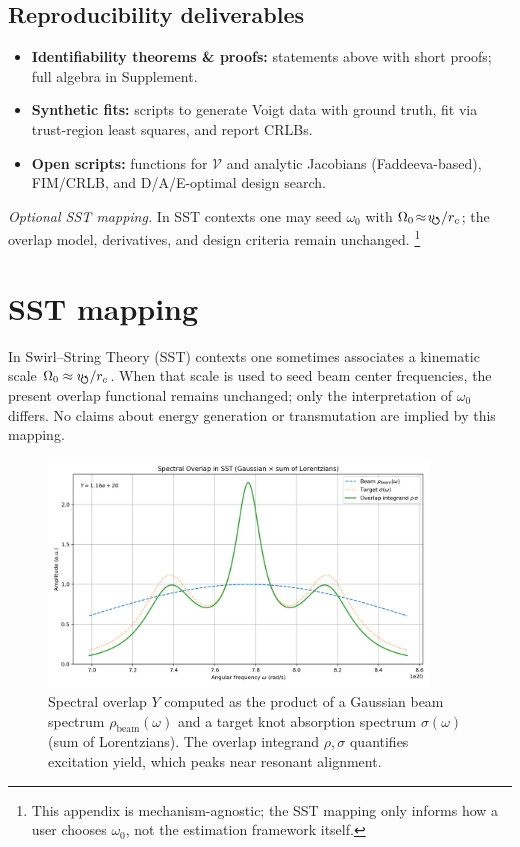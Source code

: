 \documentclass[aip,jap,preprint,amsmath,amssymb]{revtex4-2} %
\newcommand{\vswirl}{v_{\!\mkern-2mu\scriptstyle\boldsymbol{\circlearrowleft}}}
\newcommand{\rc}{r_c}
\begin{document}
\subsection{Reproducibility deliverables}
    \begin{itemize}
        \item \textbf{Identifiability theorems \& proofs:} statements above with short proofs; full algebra in Supplement.
        \item \textbf{Synthetic fits:} scripts to generate Voigt data with ground truth, fit via trust-region least squares, and report CRLBs.
        \item \textbf{Open scripts:} functions for $\mathcal{V}$ and analytic Jacobians (Faddeeva-based), FIM/CRLB, and D/A/E-optimal design search.
    \end{itemize}

    \noindent\textit{Optional SST mapping.} In SST contexts one may seed $\omega_0$ with
    $\Omega_0\!\approx\!\vswirl/\rc$; the overlap model, derivatives, and design criteria remain unchanged.%
    \footnote{This appendix is mechanism-agnostic; the SST mapping only informs how a user chooses $\omega_0$,
        not the estimation framework itself.}

    \section*{SST mapping}
    In Swirl--String Theory (SST) contexts one sometimes associates a kinematic scale
    $\Omega_0 \approx \vswirl/\rc$. When that scale is used to seed beam center frequencies,
    the present overlap functional remains unchanged; only the interpretation of $\omega_0$ differs.
    No claims about energy generation or transmutation are implied by this mapping.

    \begin{figure}[h!]
        \centering
        \includegraphics[width=0.9\textwidth]{sst_spectral_overlap}
        \caption{Spectral overlap $Y$ computed as the product of a Gaussian beam spectrum $\rho_{\mathrm{beam}}(\omega)$ and a target knot absorption spectrum $\sigma(\omega)$ (sum of Lorentzians). The overlap integrand $\rho,\sigma$ quantifies excitation yield, which peaks near resonant alignment.}
    \end{figure}
\end{document}
